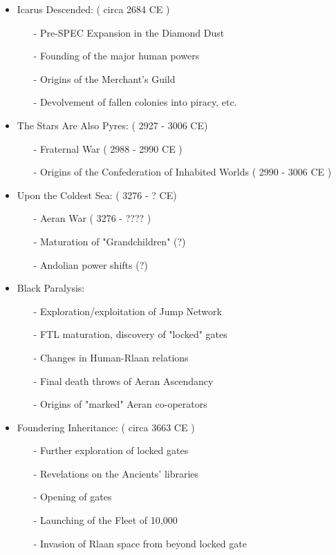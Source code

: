 \begin{itemize}
\item	Icarus Descended: ( circa 2684 CE )
\begin{itemize}
\item	[-] Pre-SPEC Expansion in the Diamond Dust
\item	[-] Founding of the major human powers
\item	[-] Origins of the Merchant's Guild
\item	[-] Devolvement of fallen colonies into piracy, etc.
\end{itemize}
\item	The Stars Are Also Pyres: ( 2927 - 3006 CE)
\begin{itemize}
\item	[-] Fraternal War ( 2988  - 2990 CE )
\item	[-] Origins of the Confederation of Inhabited Worlds ( 2990 - 3006 CE )
\end{itemize}
\item	Upon the Coldest Sea: ( 3276 - ? CE)
\begin{itemize}
\item	[-] Aeran War ( 3276 - ???? ) 
\item	[-] Maturation of "Grandchildren" (?)
\item	[-] Andolian power shifts (?)
\end{itemize}
\item	Black Paralysis:
\begin{itemize}
\item	[-] Exploration/exploitation of Jump Network
\item	[-] FTL maturation, discovery of "locked" gates
\item	[-] Changes in Human-Rlaan relations
\item	[-] Final death throws of Aeran Ascendancy
\item	[-] Origins of "marked" Aeran co-operators
\end{itemize}
\item	Foundering Inheritance: ( circa 3663 CE )
\begin{itemize}
\item	[-] Further exploration of locked gates
\item	[-] Revelations on the Ancients' libraries
\item	[-] Opening of gates
\item	[-] Launching of the Fleet of 10,000
\item	[-] Invasion of Rlaan space from beyond locked gate	

\end{itemize}
\end{itemize}
